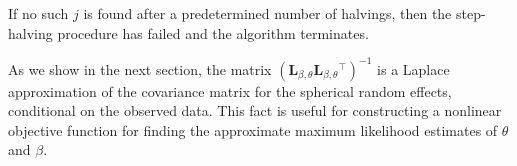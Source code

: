 \documentclass{article}
\newcommand{\trans}{\ensuremath{^\top}}
\begin{document}
If no such $j$ is found after a predetermined number of halvings, then the 
step-halving procedure has failed and the algorithm terminates. 

As we show in the next section, the matrix
$(\bm L_{\beta,\theta}\bm L_{\beta,\theta}\trans)^{-1}$ is a Laplace approximation of the covariance matrix for the spherical random effects, conditional on the
observed data. This fact is useful for constructing a nonlinear
objective function for finding the approximate maximum likelihood
estimates of $\theta$ and $\beta$.
\end{document}
